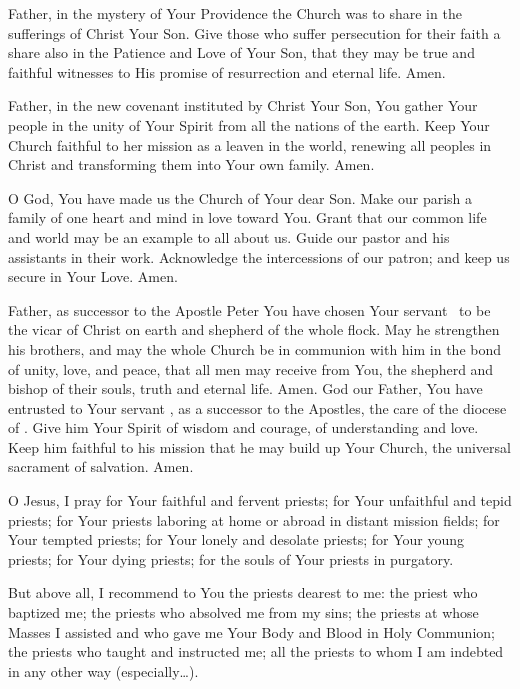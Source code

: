 Father, in the mystery of Your Providence the Church was to share in the sufferings of Christ Your Son.
Give those who suffer persecution for their faith a share also in the Patience and Love of Your Son, that they may be true and faithful witnesses to His promise of resurrection and eternal life.
Amen.

Father, in the new covenant instituted by Christ Your Son, You gather Your people in the unity of Your Spirit from all the nations of the earth.
Keep Your Church faithful to her mission as a leaven in the world, renewing all peoples in Christ and transforming them into Your own family.
Amen.

O God, You have made us the Church of Your dear Son.
Make our parish a family of one heart and mind in love toward You.
Grant that our common life and world may be an example to all about us.
Guide our pastor and his assistants in their work.
Acknowledge the intercessions of our patron; and keep us secure in Your Love.
Amen.

Father, as successor to the Apostle Peter You have chosen Your servant \insertname\ to be the vicar of Christ on earth and shepherd of the whole flock.
May he strengthen his brothers, and may the whole Church be in communion with him in the bond of unity, love, and peace, that all men may receive from You, the shepherd and bishop of their souls, truth and eternal life.
Amen.
\newpage
{}
God our Father, You have entrusted to Your servant \insertname, as a successor to the Apostles, the care of the diocese of \insertname.
Give him Your Spirit of wisdom and courage, of understanding and love.
Keep him faithful to his mission that he may build up Your Church, the universal sacrament of salvation.
Amen.

O Jesus, I pray for Your faithful and fervent priests;
for Your unfaithful and tepid priests;
for Your priests laboring at home or abroad in distant mission fields;
for Your tempted priests;
for Your lonely and desolate priests;
for Your young priests;
for Your dying priests;
for the souls of Your priests in purgatory.

But above all, I recommend to You the priests dearest to me:
the priest who baptized me;
the priests who absolved me from my sins;
the priests at whose Masses I assisted and who gave me Your Body and Blood in Holy Communion;
the priests who taught and instructed me;
all the priests to whom I am indebted in any other way (especially\ldots).

